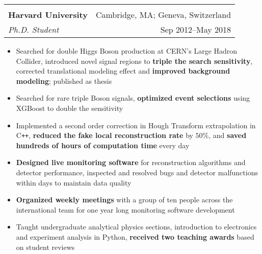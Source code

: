 \documentclass[letterpaper,11pt,oneside]{article}
\begin{document}
 \begin{flushleft}
 \vspace{-0.45cm}
 \begin{tabular}{@{} l r@{} }
    \hspace{0.6\linewidth} & \hspace{0.25\linewidth} \\
    \textbf{Harvard University} & \hspace{0.01\linewidth} Cambridge, MA; Geneva, Switzerland \\ 
    \textit{Ph.D. Student} & \hspace{0.175\linewidth} Sep 2012--May 2018 \\ 
 \end{tabular}
 \end{flushleft}
 \begin{flushleft}
  \begin{small}
 \begin{itemize}[leftmargin=*]
  \item Searched for double Higgs Boson production at CERN's Large Hadron Collider, introduced novel signal regions to \textbf{triple the search sensitivity}, corrected translational modeling effect and \textbf{improved background modeling}; published as thesis
  \item Searched for rare triple Boson signals, \textbf{optimized event selections} using XGBoost to double the sensitivity
  \item Implemented a second order correction in Hough Transform extrapolation in C\texttt{++}, \textbf{reduced the fake local reconstruction rate} by $50\%$, and \textbf{saved hundreds of hours of computation time} every day
   \item\textbf{Designed live monitoring software} for reconstruction algorithms and detector performance, inspected and resolved bugs and detector malfunctions within days to maintain data quality
  \item \textbf{Organized weekly meetings} with a group of ten people across the international team for one year long monitoring software development
  \item Taught undergraduate analytical physics sections, introduction to electronics and experiment analysis in Python, \textbf{received two teaching awards} based on student reviews
 \end{itemize}
  \end{small}
 \end{flushleft}
\end{document}
